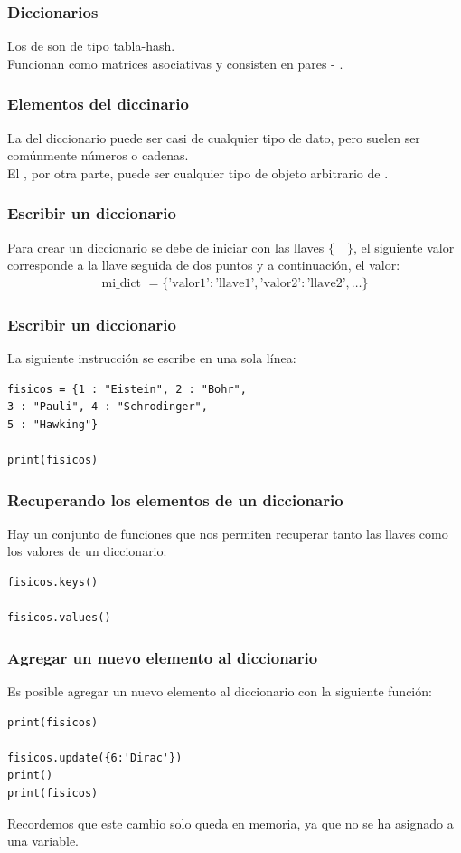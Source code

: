 \documentclass[12pt]{beamer}
\begin{document}
\begin{frame}
\frametitle{Diccionarios}
Los  de \python{} son de tipo tabla-hash.
\\
\bigskip
\pause
Funcionan como matrices asociativas y consisten en pares  - .
\end{frame}
\begin{frame}
\frametitle{Elementos del diccinario}
La  del diccionario puede ser casi de cualquier tipo de dato, pero suelen ser comúnmente números o cadenas.
\\
\bigskip
\pause
El , por otra parte, puede ser cualquier tipo de objeto arbitrario de \python.
\end{frame}
\begin{frame}[fragile]
\frametitle{Escribir un diccionario}
Para crear un diccionario se debe de iniciar con las llaves $\{ \quad \}$, \pause el siguiente valor corresponde a la llave seguida de dos puntos y a continuación, el valor:
\\
\bigskip
\pause
\begin{align*}
\mbox{mi\_dict } = \{ \mbox{'valor1'} : \mbox{'llave1'}, \mbox{'valor2'} : \mbox{'llave2'} , \ldots \} 
\end{align*}
\end{frame}
\begin{frame}[fragile]
\frametitle{Escribir un diccionario}
La siguiente instrucción se escribe en una sola línea:
\pause
\begin{lstlisting}[caption=Escribiendo un diccionario]
fisicos = {1 : "Eistein", 2 : "Bohr", 
3 : "Pauli", 4 : "Schrodinger", 
5 : "Hawking"}

print(fisicos)
\end{lstlisting}
\end{frame}
\begin{frame}[fragile]
\frametitle{Recuperando los elementos de un diccionario}
Hay un conjunto de funciones que nos permiten recuperar tanto las llaves como los valores de un diccionario:
\pause
\begin{lstlisting}[caption=Recuperando el contenido de un diccionario]
fisicos.keys()

fisicos.values()
\end{lstlisting}
\end{frame}
\begin{frame}[fragile]
\frametitle{Agregar un nuevo elemento al diccionario}
Es posible agregar un nuevo elemento al diccionario con la siguiente función:
\pause
\begin{lstlisting}[caption=Agregando un elemento al diccionario]
print(fisicos)

fisicos.update({6:'Dirac'})
print()
print(fisicos)
\end{lstlisting}
\pause
Recordemos que este cambio solo queda en memoria, ya que no se ha asignado a una variable.
\end{frame}
\end{document}

